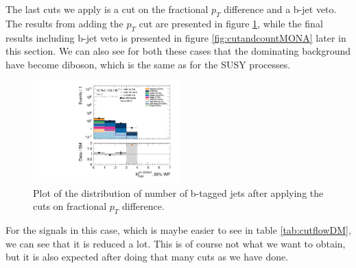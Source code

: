 The last cuts we apply is a cut on the fractional $p_T$ difference and a b-jet veto. The results from adding the $p_T$ cut are presented in figure \ref{fig:stepsDM4}, while the final results including b-jet veto is presented in figure \ref{fig:cutandcountMONA} later in this section. We can also see for both these cases that the dominating background have become diboson, which is the same as for the SUSY processes. 

\begin{figure}[H]
    \centering
        \includegraphics[width=0.5\textwidth]{Figures/MonoZcuts/hist1d_nBJet20_MV2c10_FixedCutBEff_85_mono_Z.pdf}
    \caption{Plot of the distribution of number of b-tagged jets after applying the cuts on fractional $p_T$ difference.}
    \label{fig:stepsDM4}
\end{figure}

For the signals in this case, which is maybe easier to see in table \ref{tab:cutflowDM}, we can see that it is reduced a lot. This is of course not what we want to obtain, but it is also expected after doing that many cuts as we have done.


